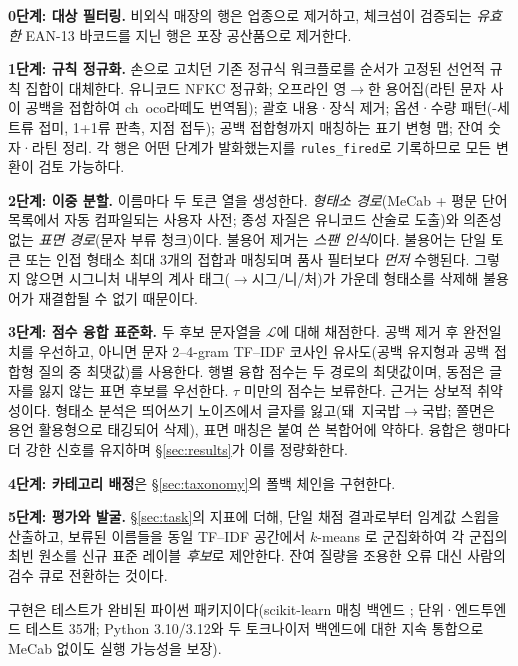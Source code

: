 \documentclass[10pt,twocolumn]{article}
\begin{document}
\textbf{0단계: 대상 필터링.} 비외식 매장의 행은 업종으로 제거하고,
체크섬이 검증되는 \emph{유효한} EAN-13 바코드를 지닌 행은 포장 공산품으로
제거한다.

\textbf{1단계: 규칙 정규화.} 손으로 고치던 기존 정규식 워크플로를
순서가 고정된 선언적 규칙 집합이 대체한다. 유니코드 NFKC 정규화; 오프라인
영$\rightarrow$한 용어집(라틴 문자 사이 공백을 접합하여
\mbox{ch oco라떼}도 번역됨); 괄호 내용·장식 제거; 옵션·수량
패턴(\mbox{-세트}류 접미, \mbox{1+1}류 판촉, 지점 접두); 공백 접합형까지
매칭하는 표기 변형 맵; 잔여 숫자·라틴 정리. 각 행은 어떤 단계가
발화했는지를 \texttt{rules\_fired}로 기록하므로 모든 변환이 검토
가능하다.

\textbf{2단계: 이중 분할.} 이름마다 두 토큰 열을 생성한다.
\emph{형태소 경로}(MeCab \cite{kudo2004} + 평문 단어 목록에서 자동
컴파일되는 사용자 사전; 종성 자질은 유니코드 산술로 도출)와 의존성 없는
\emph{표면 경로}(문자 부류 청크)이다. 불용어 제거는 \emph{스팬
인식}이다. 불용어는 단일 토큰 또는 인접 형태소 최대 3개의 접합과
매칭되며 품사 필터보다 \emph{먼저} 수행된다. 그렇지 않으면 시그니처
내부의 계사 태그($\rightarrow$시그/니/처)가 가운데 형태소를 삭제해
불용어가 재결합될 수 없기 때문이다.

\textbf{3단계: 점수 융합 표준화.} 두 후보 문자열을 $\mathcal{L}$에 대해
채점한다. 공백 제거 후 완전일치를 우선하고, 아니면 문자 2--4-gram
TF--IDF \cite{cavnar1994} 코사인 유사도(공백 유지형과 공백 접합형 질의
중 최댓값)를 사용한다. 행별 융합 점수는 두 경로의 최댓값이며, 동점은
글자를 잃지 않는 표면 후보를 우선한다. $\tau$ 미만의 점수는 보류한다.
근거는 상보적 취약성이다. 형태소 분석은 띄어쓰기 노이즈에서 글자를
잃고(\mbox{돼 지국밥}$\rightarrow$국밥; 쫄면은 용언 활용형으로 태깅되어
삭제), 표면 매칭은 붙여 쓴 복합어에 약하다. 융합은 행마다 더 강한
신호를 유지하며 \S\ref{sec:results}가 이를 정량화한다.

\textbf{4단계: 카테고리 배정}은 \S\ref{sec:taxonomy}의 폴백 체인을
구현한다.

\textbf{5단계: 평가와 발굴.} \S\ref{sec:task}의 지표에 더해, 단일 채점
결과로부터 임계값 스윕을 산출하고, 보류된 이름들을 동일 TF--IDF 공간에서
$k$-means \cite{lloyd1982}로 군집화하여 각 군집의 최빈 원소를 신규 표준
레이블 \emph{후보}로 제안한다. 잔여 질량을 조용한 오류 대신 사람의 검수
큐로 전환하는 것이다.

구현은 테스트가 완비된 파이썬 패키지이다(scikit-learn 매칭 백엔드
\cite{pedregosa2011}; 단위·엔드투엔드 테스트 35개; Python 3.10/3.12와
두 토크나이저 백엔드에 대한 지속 통합으로 MeCab 없이도 실행 가능성을
보장).
\end{document}
